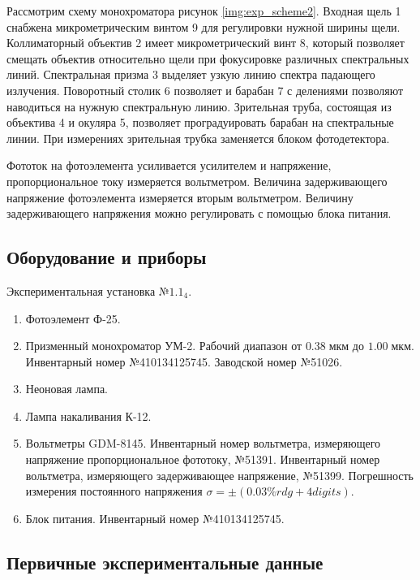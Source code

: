 \documentclass[10pt,a4paper]{article}
\newcommand{\um}{\; мкм}
\begin{document}
	Рассмотрим схему монохроматора рисунок \ref{img:exp_scheme2}. Входная щель 1 снабжена микрометрическим винтом 9 для регулировки нужной ширины щели. Коллиматорный объектив 2 имеет микрометрический винт 8, который позволяет смещать объектив относительно щели при фокусировке различных спектральных линий. Спектральная призма 3 выделяет узкую линию спектра падающего излучения. Поворотный столик 6 позволяет и барабан 7 с делениями позволяют наводиться на нужную спектральную линию. Зрительная труба, состоящая из объектива 4 и окуляра 5, позволяет проградуировать барабан на спектральные линии. При измерениях зрительная трубка заменяется блоком фотодетектора. 
	
	Фототок на фотоэлемента усиливается усилителем и напряжение, пропорциональное току измеряется вольтметром. Величина задерживающего напряжение фотоэлемента измеряется вторым вольтметром. Величину задерживающего напряжения можно регулировать с помощью блока питания.

	\subsection*{Оборудование и приборы}
	
	Экспериментальная установка $№1.1_4$.
	
	\begin{enumerate}
		\item Фотоэлемент Ф-25.
		
		\item Призменный монохроматор УМ-2. Рабочий диапазон от $0.38 \um$ до $1.00 \um$. Инвентарный номер №410134125745. Заводской номер №51026.
		
		\item Неоновая лампа.
		
		\item Лампа накаливания К-12.
		
		\item Вольтметры GDM-8145. Инвентарный номер вольтметра, измеряющего напряжение пропорциональное фототоку, №51391. Инвентарный номер вольтметра, измеряющего задерживающее напряжение, №51399. Погрешность измерения постоянного напряжения $\sigma = \pm (0.03\% rdg + 4 digits).$
		
		\item Блок питания. Инвентарный номер №410134125745.
	\end{enumerate}
	
	\subsection*{Первичные экспериментальные данные}
	
\end{document}
